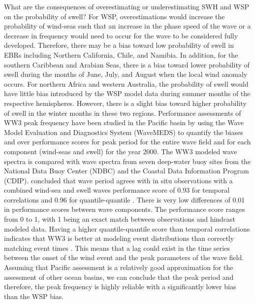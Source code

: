 \documentclass[draft,linenumbers]{agujournal2018}
\begin{document}
What are the consequences of overestimating or underestimating SWH and WSP on the probability of swell? For WSP, overestimations would increase the probability of wind-seas such that an increase in the phase speed of the wave or a decrease in frequency would need to occur for the wave to be considered fully developed. Therefore, there may be a bias toward low probability of swell in EBRs including Northern California, Chile, and Namibia. In addition, for the southern Caribbean and Arabian Seas, there is a bias toward lower probability of swell during the months of June, July, and August when the local wind anomaly occurs. For northern Africa and western Australia, the probability of swell would have little bias introduced by the WSP model data during summer months of the respective hemispheres. However, there is a slight bias toward higher probability of swell in the winter months in these two regions. Performance assessments of WW3 peak frequency have been studied in the Pacific basin by \citet{hanson2009pacific} using the Wave Model Evaluation and Diagnostics System (WaveMEDS) to quantify the biases and over performance scores for peak period for the entire wave field and for each component (wind-seas and swell) for the year 2000. The WW3 modeled wave spectra is compared with wave spectra from seven deep-water buoy sites from the National Data Buoy Center (NDBC) and the Coastal Data Information Program (CDIP). \citet{hanson2009pacific} concluded that wave period agrees with in situ observations with a combined wind-sea and swell waves performance score of 0.93 for temporal correlations and 0.96 for quantile-quantile \cite{hanson2009pacific}. There is very low differences of 0.01 in performance scores between wave components. The performance score ranges from 0 to 1, with 1 being an exact match between observations and hindcast modeled data. Having a higher quantile-quantile score than temporal correlations indicates that WW3 is better at modeling event distributions than correctly matching event times \cite{hanson2009pacific}. This means that a lag could exist in the time series between the onset of the wind event and the peak parameters of the wave field. Assuming that Pacific assessment is a relatively good approximation for the assessment of other ocean basins, we can conclude that the peak period and therefore, the peak frequency is highly reliable with a significantly lower bias than the WSP bias. 
\end{document}
